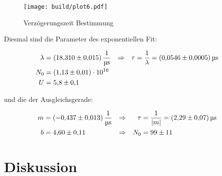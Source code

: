 \begin{figure}[H]
	\centering
	\texttt{[image: build/plot6.pdf]}
	\caption{Verzögerungszeit Bestimmung}\label{fig:plt6}
\end{figure}

\newpage
Diesmal sind die Parameter des exponentiellen Fit:

\begin{align}
	\lambda&=\qty{18.31(0.015)}{\per\us} &\Rightarrow & & \tau&=\frac{1}{\lambda }=\qty{0.0546(0.0005)}{\us} \\
	N_0&=\num{1.13(0.1)e10} \notag \\
	U&=\num{5.8(1)} \notag
\end{align}

und die der Ausgleichsgerade:

\begin{align}
	m&=\qty{-0.437(0.013)}{\per\us} &\Rightarrow & & \tau&=\frac{1}{|m|}=\qty{2.29(0.07)}{\us} \\
	b&=\num{4.60(0.11)} &\Rightarrow & & N_0&=\num{99(11)} \notag
\end{align}

\newpage
\section{Diskussion}


\newpage
\printbibliography

